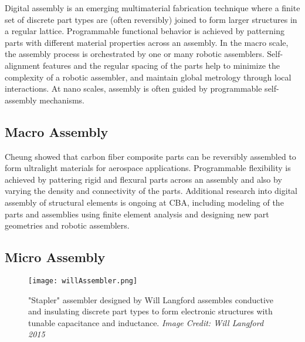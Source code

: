 {Digital assembly is an emerging multimaterial fabrication technique where a finite set of discrete part types are (often reversibly) joined to form larger structures in a regular lattice.  Programmable functional behavior is achieved by patterning parts with different material properties across an assembly.  In the macro scale, the assembly process is orchestrated by one or many robotic assemblers.  Self-alignment features and the regular spacing of the parts help to minimize the complexity of a robotic assembler, and maintain global metrology through local interactions.  At nano scales, assembly is often guided by programmable self-assembly mechanisms.


\subsection{Macro Assembly}

Cheung showed that carbon fiber composite parts can be reversibly assembled to form ultralight materials for aerospace applications\cite{Cheung2013}.  Programmable flexibility is achieved by pattering rigid and flexural parts across an assembly and also by varying the density and connectivity of the parts.  Additional research into digital assembly of structural elements is ongoing at CBA, including modeling of the parts and assemblies using finite element analysis\cite{Calisch2014} and designing new part geometries and robotic assemblers\cite{Carney2015}.

\subsection{Micro Assembly}

\begin{figure}
  \texttt{[image: willAssembler.png]}
  \caption{"Stapler" assembler designed by Will Langford assembles conductive and insulating discrete part types to form electronic structures with tunable capacitance and inductance.  \textit{Image Credit: Will Langford 2015}}
  \label{fig:willAssembler}
\end{figure}



}
